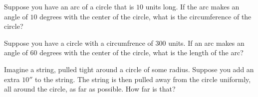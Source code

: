 \documentclass[noauthor,nooutcomes]{ximera}
\author{Bart Snapp}
\begin{document}
\maketitle






    

   

\begin{exercise}
 Suppose you have an arc of a circle that is $10$ units long. If the
 arc makes an angle of $10$ degrees with the center of the circle,
 what is the circumference of the circle?
\end{exercise}



\begin{exercise}
 Suppose you have a circle with a circumfrence of $300$ units. If an
 arc makes an angle of $60$ degrees with the center of the circle,
 what is the length of the arc?
\end{exercise}





\begin{exercise}
Imagine a string, pulled tight around a circle of some radius. Suppose
you add an extra $10''$ to the string. The string is then pulled away
from the circle uniformly, all around the circle, as far as
possible. How far is that?
\end{exercise}


\end{document}
